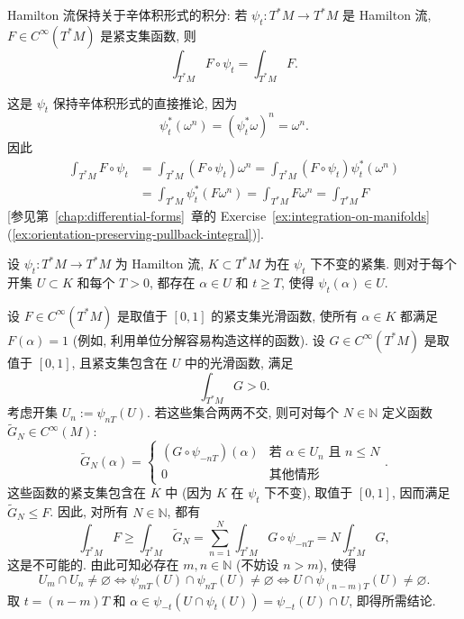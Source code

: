 \begin{RiemannTheorem}[Liouville]\label{thm:liouville-preservation-of-symplectic-volume}
Hamilton 流保持关于辛体积形式的积分: 若 $\psi_t:T^*M\to T^*M$ 是 Hamilton 流, $F\in C^\infty(T^*M)$ 是紧支集函数, 则
\[
  \int_{T^*M}F\circ\psi_t=\int_{T^*M}F.
\]
\end{RiemannTheorem}

\begin{RiemannProof}
这是 $\psi_t$ 保持辛体积形式的直接推论, 因为
\[
  \psi_t^*(\omega^n)=(\psi_t^*\omega)^n=\omega^n.
\]
因此
\begin{align*}
  \int_{T^*M}F\circ\psi_t
  &=\int_{T^*M}(F\circ\psi_t)\omega^n
   =\int_{T^*M}(F\circ\psi_t)\psi_t^*(\omega^n)\\
  &=\int_{T^*M}\psi_t^*(F\omega^n)=\int_{T^*M}F\omega^n=\int_{T^*M}F
\end{align*}
[参见第~\ref{chap:differential-forms}~章的 Exercise~\ref{ex:integration-on-manifolds}(\ref{ex:orientation-preserving-pullback-integral})].
\end{RiemannProof}

\begin{RiemannTheorem}[Poincaré 回归]\label{thm:poincare-recurrence-for-hamiltonian-flow}
设 $\psi_t:T^*M\to T^*M$ 为 Hamilton 流, $K\subset T^*M$ 为在 $\psi_t$ 下不变的紧集. 则对于每个开集 $U\subset K$ 和每个 $T>0$, 都存在 $\alpha\in U$ 和 $t\geq T$, 使得 $\psi_t(\alpha)\in U$.
\end{RiemannTheorem}

\begin{RiemannProof}
设 $F\in C^\infty(T^*M)$ 是取值于 $[0,1]$ 的紧支集光滑函数, 使所有 $\alpha\in K$ 都满足 $F(\alpha)=1$ (例如, 利用单位分解容易构造这样的函数). 设 $G\in C^\infty(T^*M)$ 是取值于 $[0,1]$, 且紧支集包含在 $U$ 中的光滑函数, 满足
\[
  \int_{T^*M}G>0.
\]
考虑开集 $U_n:=\psi_{nT}(U)$. 若这些集合两两不交, 则可对每个 $N\in\mathbb{N}$ 定义函数 $\widetilde G_N\in C^\infty(M)$:
\[
  \widetilde G_N(\alpha)=
  \begin{cases}
    (G\circ\psi_{-nT})(\alpha) & \text{若 $\alpha\in U_n$ 且 $n\leq N$}\\
    0 & \text{其他情形}
  \end{cases}.
\]
这些函数的紧支集包含在 $K$ 中 (因为 $K$ 在 $\psi_t$ 下不变), 取值于 $[0,1]$, 因而满足 $\widetilde G_N\leq F$. 因此, 对所有 $N\in\mathbb{N}$, 都有
\[
  \int_{T^*M}F\geq\int_{T^*M}\widetilde G_N
   =\sum_{n=1}^N\int_{T^*M}G\circ\psi_{-nT}=N\int_{T^*M}G,
\]
这是不可能的. 由此可知必存在 $m,n\in\mathbb{N}$ (不妨设 $n>m$), 使得
\[
  U_m\cap U_n\ne\varnothing
  \iff\psi_{mT}(U)\cap\psi_{nT}(U)\ne\varnothing
  \iff U\cap\psi_{(n-m)T}(U)\ne\varnothing.
\]
取 $t=(n-m)T$ 和 $\alpha\in\psi_{-t}(U\cap\psi_t(U))=\psi_{-t}(U)\cap U$, 即得所需结论.
\end{RiemannProof}

